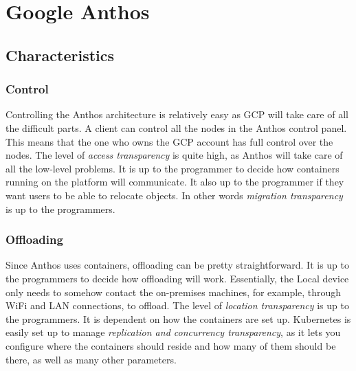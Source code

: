 















\section{Google Anthos}
\subsection{Characteristics}
\subsubsection{Control}
Controlling the Anthos architecture is relatively easy as GCP will take care of all the difficult parts. A client can control all the nodes in the Anthos control panel. This means that the one who owns the GCP account has full control over the nodes. The level of \textit{access transparency} is quite high, as Anthos will take care of all the low-level problems. It is up to the programmer to decide how containers running on the platform will communicate. It also up to the programmer if they want users to be able to relocate objects. In other words \textit{migration transparency} is up to the programmers.

\subsubsection{Offloading}
Since Anthos uses containers, offloading can be pretty straightforward. It is up to the programmers to decide how offloading will work. Essentially, the Local device only needs to somehow contact the on-premises machines, for example, through WiFi and LAN connections, to offload. The level of \textit{location transparency} is up to the programmers. It is dependent on how the containers are set up. Kubernetes is easily set up to manage \textit{replication and concurrency transparency}, as it lets you configure where the containers should reside and how many of them should be there, as well as many other parameters.

